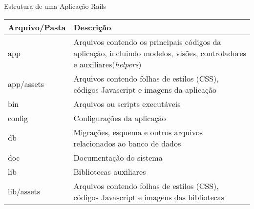 
\begin{frame}{Estrutura de uma Aplicação Rails}
  \begin{table}\centering\scriptsize
    \begin{tabular}{@{}lp{8cm}@{}}\toprule
	  \textbf{Arquivo/Pasta} & \textbf{Descrição}	\\ \midrule
	  app & Arquivos contendo os principais códigos da aplicação, incluindo modelos, visões,  
	    controladores e auxiliares(\textit{helpers})\\
	  app/assets & Arquivos contendo folhas de estilos (CSS), códigos Javascript e imagens da 
	    aplicação\\
	  bin & Arquivos ou scripts executáveis\\
	  config & Configurações da aplicação	\\
	  db & Migrações, esquema e outros arquivos relacionados ao banco de dados	\\ 
	  doc & Documentação do sistema	\\
	  lib & Bibliotecas auxiliares	\\
	  lib/assets & Arquivos contendo folhas de estilos (CSS), códigos Javascript e imagens das
	    bibliotecas\\ \bottomrule
    \end{tabular}
  \end{table}	    
  

\end{frame}
